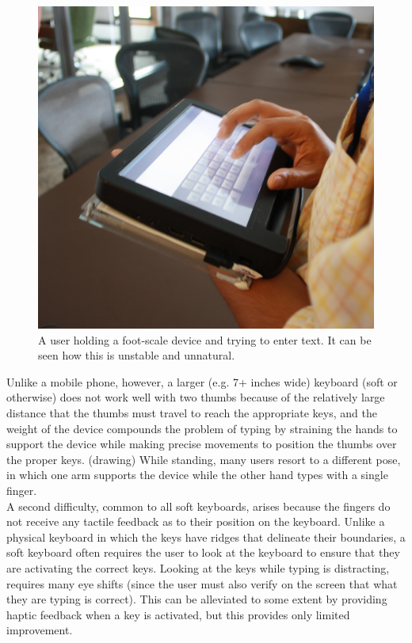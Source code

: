 \begin{figure}
    \includegraphics[scale=0.35]{device_hold.eps} 
  	\caption{A user holding a foot-scale device and trying to enter text. It can be seen how this is unstable and unnatural.}
\end{figure}
Unlike a mobile phone, however, a larger (e.g. 7+ inches wide) keyboard (soft or otherwise) does not work well with two thumbs because of the relatively large distance that the thumbs must travel to reach the appropriate keys, and the weight of the device compounds the problem of typing by straining the hands to support the device while making precise movements to position the thumbs over the proper keys. (drawing)   While standing, many users resort to a different pose, in which one arm supports the device while the other hand types with a single finger.\\
A second difficulty, common to all soft keyboards, arises because the fingers do not receive any tactile feedback as to their position on the keyboard.  Unlike a physical keyboard in which the keys have ridges that delineate their boundaries, a soft keyboard often requires the user to look at the keyboard to ensure that they are activating the correct keys.  Looking at the keys while typing is distracting, requires many eye shifts (since the user must also verify on the screen that what they are typing is correct).  This can be alleviated to some extent by providing haptic feedback when a key is activated, but this provides only limited improvement.\\ 
